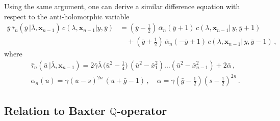 \documentclass[a4paper,11pt]{article}
\numberwithin{equation}{section}
\begin{document}
Using the same argument, one can derive a similar difference equation with respect to the anti-holomorphic variable
\begin{equation}\label{sov2bar}
    \begin{split}
        \bar{y}\,\bar{\tau}_n(\bar{y}\,|\bar{\lambda},\bm{x}_{n-1})\,c(\lambda, \bm{x}_{n-1}|y, \bar{y}) 
        &= \left(\bar{y}-\tfrac{1}{2}\right)\,\bar{\alpha}_n(\bar{y}+1)\,c(\lambda, \bm{x}_{n-1}|\,y, \bar{y}+1) \\
        &\quad + \left(\bar{y}+\tfrac{1}{2}\right)\,\bar{\alpha}_n(-\bar{y}+1)\,c(\lambda, \bm{x}_{n-1}|\,y, \bar{y}-1) \,,
    \end{split} 
\end{equation}
where
\begin{align*}
	&
	\bar{\tau}_n(\bar{u}\,|\bar{\lambda},\bm{x}_{n-1}) = 2\bar{\gamma}\bar{\lambda}\,\bigl(\bar{u}^2-\tfrac{1}{4}\bigr)\,(\bar{u}^2-\bar{x}_1^2) \ldots (\bar{u}^2-\bar{x}_{n-1}^2) + 2\bar{\alpha} \,, \\
	&
	\bar{\alpha}_n(\bar{u}) = \bar{\gamma}(\bar{u}-\bar{s})^{2n}\,(\bar{u}+\bar{g}-1) \,, \quad
	\bar{\alpha} = \bar{\gamma}(\bar{g}-\tfrac{1}{2})(\bar{s}-\tfrac{1}{2})^{2n} \,.
\end{align*}


\subsection{Relation to Baxter $\mathbb{Q}$-operator}
\end{document}
